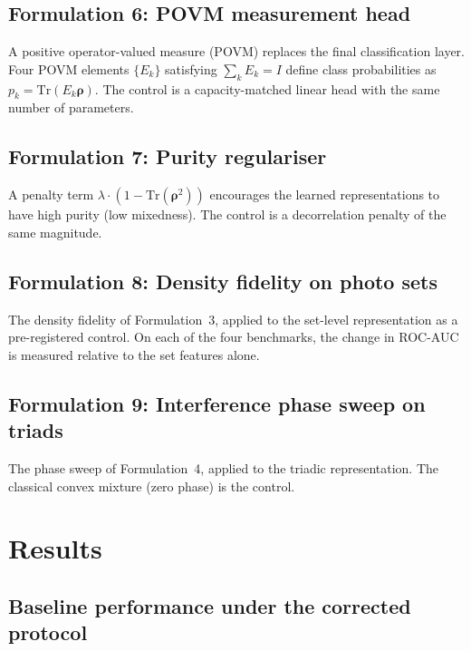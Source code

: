 \documentclass[preprint,12pt]{elsarticle}
\begin{document}
\subsection{Formulation 6: POVM measurement head}

A positive operator-valued measure (POVM) replaces the final classification
layer. Four POVM elements $\{E_k\}$ satisfying $\sum_k E_k = I$ define class
probabilities as $p_k = \mathrm{Tr}(E_k \bm{\rho})$. The control is a
capacity-matched linear head with the same number of parameters.

\subsection{Formulation 7: Purity regulariser}

A penalty term $\lambda \cdot (1 - \mathrm{Tr}(\bm{\rho}^2))$ encourages
the learned representations to have high purity (low mixedness). The control
is a decorrelation penalty of the same magnitude.

\subsection{Formulation 8: Density fidelity on photo sets}

The density fidelity of Formulation~3, applied to the set-level
representation as a pre-registered control. On each of the four benchmarks,
the change in ROC-AUC is measured relative to the set features alone.

\subsection{Formulation 9: Interference phase sweep on triads}

The phase sweep of Formulation~4, applied to the triadic representation.
The classical convex mixture (zero phase) is the control.

\section{Results}
\label{sec:results}

\subsection{Baseline performance under the corrected protocol}
\label{sec:baseline}
\end{document}
